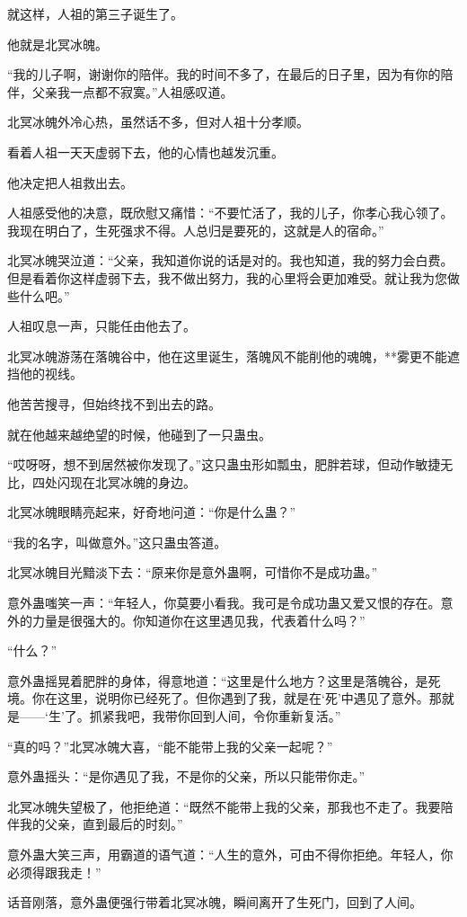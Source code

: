 \begin{this_body}
就这样，人祖的第三子诞生了。

他就是北冥冰魄。

“我的儿子啊，谢谢你的陪伴。我的时间不多了，在最后的日子里，因为有你的陪伴，父亲我一点都不寂寞。”人祖感叹道。

北冥冰魄外冷心热，虽然话不多，但对人祖十分孝顺。

看着人祖一天天虚弱下去，他的心情也越发沉重。

他决定把人祖救出去。

人祖感受他的决意，既欣慰又痛惜：“不要忙活了，我的儿子，你孝心我心领了。我现在明白了，生死强求不得。人总归是要死的，这就是人的宿命。”

北冥冰魄哭泣道：“父亲，我知道你说的话是对的。我也知道，我的努力会白费。但是看着你这样虚弱下去，我不做出努力，我的心里将会更加难受。就让我为您做些什么吧。”

人祖叹息一声，只能任由他去了。

北冥冰魄游荡在落魄谷中，他在这里诞生，落魄风不能削他的魂魄，**雾更不能遮挡他的视线。

他苦苦搜寻，但始终找不到出去的路。

就在他越来越绝望的时候，他碰到了一只蛊虫。

“哎呀呀，想不到居然被你发现了。”这只蛊虫形如瓢虫，肥胖若球，但动作敏捷无比，四处闪现在北冥冰魄的身边。

北冥冰魄眼睛亮起来，好奇地问道：“你是什么蛊？”

“我的名字，叫做意外。”这只蛊虫答道。

北冥冰魄目光黯淡下去：“原来你是意外蛊啊，可惜你不是成功蛊。”

意外蛊嗤笑一声：“年轻人，你莫要小看我。我可是令成功蛊又爱又恨的存在。意外的力量是很强大的。你知道你在这里遇见我，代表着什么吗？”

“什么？”

意外蛊摇晃着肥胖的身体，得意地道：“这里是什么地方？这里是落魄谷，是死境。你在这里，说明你已经死了。但你遇到了我，就是在‘死’中遇见了意外。那就是——‘生’了。抓紧我吧，我带你回到人间，令你重新复活。”

“真的吗？”北冥冰魄大喜，“能不能带上我的父亲一起呢？”

意外蛊摇头：“是你遇见了我，不是你的父亲，所以只能带你走。”

北冥冰魄失望极了，他拒绝道：“既然不能带上我的父亲，那我也不走了。我要陪伴我的父亲，直到最后的时刻。”

意外蛊大笑三声，用霸道的语气道：“人生的意外，可由不得你拒绝。年轻人，你必须得跟我走！”

话音刚落，意外蛊便强行带着北冥冰魄，瞬间离开了生死门，回到了人间。


\end{this_body}
